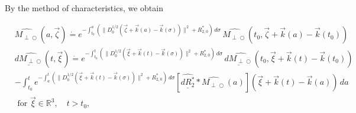 \documentclass{ws-m3as}
\newcommand{\uld}[1]{\underline{d#1}}
\def\Mpp{M_{\perp\!\!\!\!\!\bigcirc}}
\def\Mphp{\widehat{\Mpp}}
\newcommand{\Dterm}[1]{\|D_0^{1/2}{#1}\|^2}
\begin{document}
By the method of characteristics, we obtain 

\begin{equation*}
\begin{aligned}
&\Mphp(a,\vec\zeta)\dot{=}
e^{-\int_{t_0}^a(\Dterm{(\vec\zeta+{\vec k}(a)-\vec k(\sigma))}+R_{2,0}^*)\, d\sigma}\,\Mphp(t_0,\vec\zeta+{\vec k}(a)-\vec k(t_0))\\[1ex]
&\uld{\Mphp}(t,\vec\xi)\dot{=}
e^{-\int_{t_0}^t(\Dterm{(\vec\xi+{\vec k}(t)-\vec k(\sigma))}+R_{2,0}^*)\, d\sigma}\,\uld{\Mphp}(t_0,\vec\xi+{\vec k}(t)-{\vec k}(t_0))
\\&-\int_{t_0}^t e^{-\int_a^t(\Dterm{(\vec\xi+{\vec k}(t)-\vec k(\sigma))}+R_{2,0}^*)\, d\sigma}
[\widehat{\uld{R_2^*}}*{\Mphp}(a)](\vec\xi+{\vec k}(t)-{\vec k}(a))\, da\\[1ex]
&\text{ for }\vec\xi\in\mathbb{R}^3, \quad t>t_0,
\end{aligned}
\end{equation*}
\end{document}
